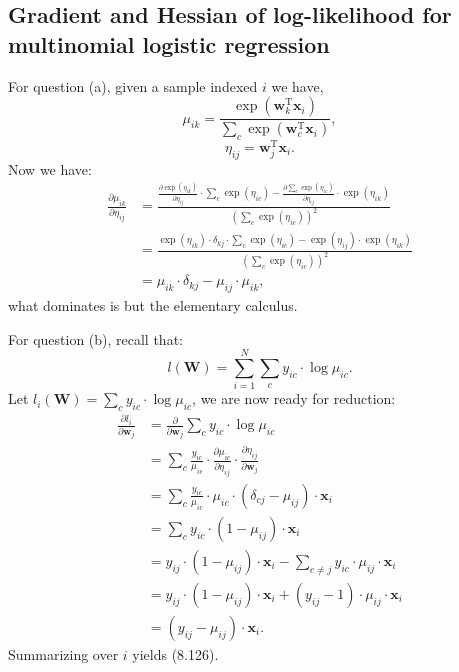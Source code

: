 \documentclass[UTF8]{ctexart}
\begin{document}
\subsection{Gradient and Hessian of log-likelihood for multinomial logistic regression}
For question (a), given a sample indexed $i$ we have,
$$\mu_{ik}=\frac{\exp(\textbf{w}_{k}^{\text{T}}\textbf{x}_{i})}{\sum_{c}\exp(\textbf{w}_{c}^{\text{T}}\textbf{x}_{i})},$$
$$\eta_{ij}=\textbf{w}_{j}^{\text{T}}\textbf{x}_{i}.$$
Now we have:
$$
\begin{aligned}
\frac{\partial \mu_{ik}}{\partial \eta_{ij}}&=\frac{\frac{\partial \exp(\eta_{ik})}{\partial \eta_{ij}}\cdot \sum_{c}\exp(\eta_{ic}) - \frac{\partial \sum_{c}\exp(\eta_{ic})}{\partial \eta_{ij}}\cdot\exp(\eta_{ik}) }{\left(\sum_{c}\exp(\eta_{ic}) \right)^{2}} \\
&=\frac{\exp\left(\eta_{ik}\right)\cdot\delta_{kj}\cdot \sum_{c}\exp(\eta_{ic})  - \exp\left(\eta_{ij}\right)\cdot \exp(\eta_{ik})}{\left(\sum_{c}\exp(\eta_{ic}) \right)^{2}}\\
&=\mu_{ik}\cdot\delta_{kj}-\mu_{ij}\cdot\mu_{ik},
\end{aligned}
$$
what dominates is but the elementary calculus.

For question (b), recall that:
$$l(\textbf{W})=\sum_{i=1}^{N}\sum_{c}y_{ic}\cdot \log \mu_{ic}.$$
Let $l_{i}(\textbf{W})=\sum_{c}y_{ic}\cdot\log \mu_{ic}$, we are now ready for reduction:
$$
\begin{aligned}
\frac{\partial l_{i}}{\partial \textbf{w}_{j}}&=\frac{\partial }{\partial \textbf{w}_{j}} \sum_{c}y_{ic}\cdot\log \mu_{ic} \\
&=\sum_{c}\frac{y_{ic}}{\mu_{ic}}\cdot\frac{\partial\mu_{ic}}{\partial\eta_{ij}}\cdot\frac{\partial\eta_{ij}}{\partial\textbf{w}_{j}}\\
&=\sum_{c}\frac{y_{ic}}{\mu_{ic}}\cdot\mu_{ic}\cdot(\delta_{cj}-\mu_{ij})\cdot\textbf{x}_{i}\\
&=\sum_{c}y_{ic}\cdot(1-\mu_{ij})\cdot\textbf{x}_{i}\\
&=y_{ij}\cdot(1-\mu_{ij})\cdot\textbf{x}_{i}-\sum_{c\neq j}y_{ic}\cdot\mu_{ij}\cdot\textbf{x}_{i}\\
&=y_{ij}\cdot(1-\mu_{ij})\cdot\textbf{x}_{i}+(y_{ij}-1)\cdot\mu_{ij}\cdot\textbf{x}_{i}\\
&=(y_{ij}-\mu_{ij})\cdot\textbf{x}_{i}.
\end{aligned}
$$
Summarizing over $i$ yields (8.126).
\end{document}
